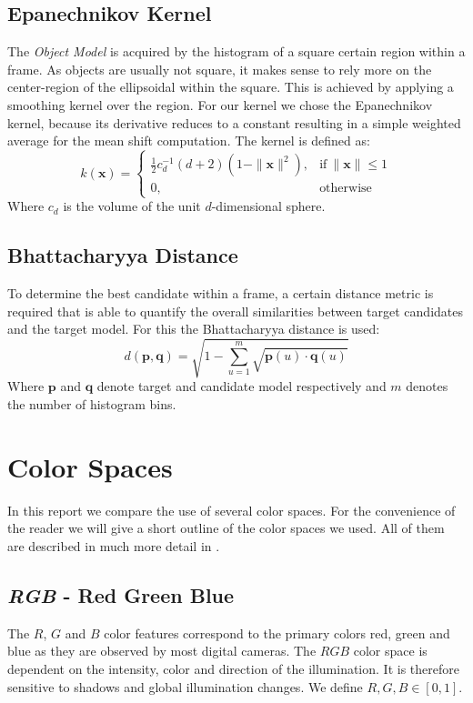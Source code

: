 \documentclass[11pt]{article}
\begin{document}
\subsection{Epanechnikov Kernel}
The \emph{Object Model} is acquired by the histogram of a square certain region
within a frame. As objects are usually not square, it makes sense to rely more
on the center-region of the ellipsoidal within the square. This is achieved by
applying a smoothing kernel over the region. For our kernel we chose the
Epanechnikov kernel, because its derivative reduces to a constant resulting in
a simple weighted average for the mean shift computation. The kernel is defined
as:
\begin{equation}
k(\mathbf{x}) = \left\{
\begin{array}{ll}
\frac{1}{2}c^{-1}_d(d+2)(1-\|\mathbf{x}\|^2), & \textrm{if}~\|\mathbf{x}\| \leq 1 \\
0, & \textrm{otherwise}
\end{array}
\right.
\end{equation}
Where $c_d$ is the volume of the unit $d$-dimensional sphere.

\subsection{Bhattacharyya Distance}
To determine the best candidate within a frame, a certain distance metric is
required that is able to quantify the overall similarities between target
candidates and the target model. For this the Bhattacharyya distance is used:
\begin{equation}
d(\mathbf{p},\mathbf{q}) = \sqrt{1 - \sum^m_{u=1} \sqrt{\mathbf{p}(u) \cdot \mathbf{q}(u)}}
\end{equation}
Where $\mathbf{p}$ and $\mathbf{q}$ denote target and candidate model respectively and $m$
denotes the number of histogram bins.

\section{Color Spaces} \label{sec:color}
In this report we compare the use of several color spaces. For the convenience
of the reader we will give a short outline of the color spaces we used. All of
them are described in much more detail in \cite{Gevers}.

\subsection{\textit{RGB} - Red Green Blue}
The $R$, $G$ and $B$  color features correspond to the primary colors red,
green and blue as they are observed by most digital cameras. The
$RGB$ color space is dependent on the intensity, color and direction of the
illumination. It is therefore sensitive to shadows and global illumination
changes. We define $R, G, B \in [0,1]$.
\end{document}
